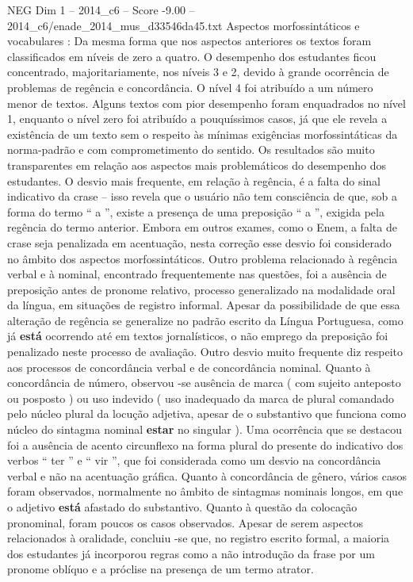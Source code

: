 \begin{textsample}{NEG Dim 1 – 2014\_c6 – Score -9.00 – 2014\_c6/enade\_2014\_mus\_d33546da45.txt}
Aspectos morfossintáticos e vocabulares : Da mesma forma que nos aspectos anteriores os textos foram classificados em níveis de zero a quatro.
O desempenho dos estudantes ficou concentrado, majoritariamente, nos níveis 3 e 2, devido à grande ocorrência de problemas de regência e concordância.
O nível 4 foi atribuído a um número menor de textos.
Alguns textos com pior desempenho foram enquadrados no nível 1, enquanto o nível zero foi atribuído a pouquíssimos casos, já que ele revela a existência de um texto sem o respeito às mínimas exigências morfossintáticas da norma-padrão e com comprometimento do sentido.
Os resultados são muito transparentes em relação aos aspectos mais problemáticos do desempenho dos estudantes.
O desvio mais frequente, em relação à regência, é a falta do sinal indicativo da crase – isso revela que o usuário não tem consciência de que, sob a forma do termo “ a ”, existe a presença de uma preposição “ a ”, exigida pela regência do termo anterior.
Embora em outros exames, como o Enem, a falta de crase seja penalizada em acentuação, nesta correção esse desvio foi considerado no âmbito dos aspectos morfossintáticos.
Outro problema relacionado à regência verbal e à nominal, encontrado frequentemente nas questões, foi a ausência de preposição antes de pronome relativo, processo generalizado na modalidade oral da língua, em situações de registro informal.
Apesar da possibilidade de que essa alteração de regência se generalize no padrão escrito da Língua Portuguesa, como já \textbf{está} ocorrendo até em textos jornalísticos, o não emprego da preposição foi penalizado neste processo de avaliação.
Outro desvio muito frequente diz respeito aos processos de concordância verbal e de concordância nominal.
Quanto à concordância de número, observou -se ausência de marca ( com sujeito anteposto ou posposto ) ou uso indevido ( uso inadequado da marca de plural comandado pelo núcleo plural da locução adjetiva, apesar de o substantivo que funciona como núcleo do sintagma nominal \textbf{estar} no singular ).
Uma ocorrência que se destacou foi a ausência de acento circunflexo na forma plural do presente do indicativo dos verbos “ ter ” e “ vir ”, que foi considerada como um desvio na concordância verbal e não na acentuação gráfica.
Quanto à concordância de gênero, vários casos foram observados, normalmente no âmbito de sintagmas nominais longos, em que o adjetivo \textbf{está} afastado do substantivo.
Quanto à questão da colocação pronominal, foram poucos os casos observados.
Apesar de serem aspectos relacionados à oralidade, concluiu -se que, no registro escrito formal, a maioria dos estudantes já incorporou regras como a não introdução da frase por um pronome oblíquo e a próclise na presença de um termo atrator.

\end{textsample}
